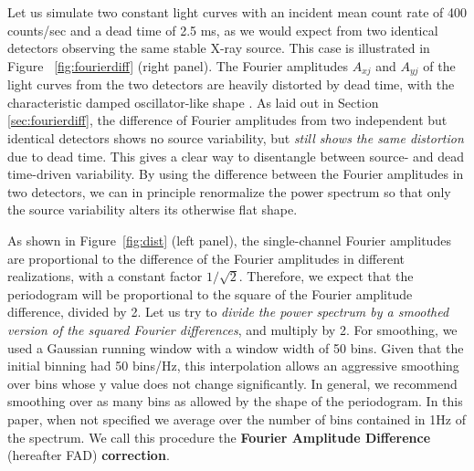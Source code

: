 \documentclass[twocolumn]{aastex61}
\begin{document}
\begin{figure*}

\caption{(a) Scatter distribution of dead time-affected Fourier amplitudes versus the difference of Fourier amplitudes:
their relation is clearly linear, with a factor $1/\sqrt{2}$. 
(b) Distribution of powers in the periodogram, before the FAD correction and after, shown as a histogram.
After correction, the powers follow remarkably well the expected $\chi^2_2$ distribution.
(c) Same, for the cospectrum.
The correct Laplace distribution is followed after FAD correction}
\label{fig:dist}
\end{figure*}

Let us simulate two constant light curves with an incident mean count rate of 400 counts/sec and a dead time of 2.5 ms, as we would expect from two identical detectors observing the same stable X-ray source. 
This case is illustrated in Figure ~\ref{fig:fourierdiff} (right panel).
The Fourier amplitudes $A_{xj}$ and $A_{yj}$ of the light curves from the two detectors are heavily distorted by dead time, with the characteristic damped oscillator-like shape \citep{Vikhlinin+94,Zhang+95}. 
As laid out in Section \ref{sec:fourierdiff}, the difference of Fourier amplitudes from two independent but identical detectors shows no source variability, but \textit{still shows the same distortion} due to dead time.
This gives a clear way to disentangle between source- and dead time-driven variability.
By using the difference between the Fourier amplitudes in two detectors, we can in principle renormalize the power spectrum so that only the source variability alters its otherwise flat shape.

As shown in Figure~\ref{fig:dist} (left panel), the single-channel Fourier amplitudes are proportional to the difference of the Fourier amplitudes in different realizations, with a constant factor $1/\sqrt{2}$.
Therefore, we expect that the periodogram will be proportional to the square of the Fourier amplitude difference, divided by 2.
Let us try to \textit{divide the power spectrum by a smoothed version of the squared Fourier differences}, and multiply by 2.
For smoothing, we used a Gaussian running window with a window width of 50 bins.
Given that the initial binning had 50 bins/Hz, this interpolation allows an aggressive smoothing over bins whose y value does not change significantly.
In general, we recommend smoothing over as many bins as allowed by the shape of the periodogram.
In this paper, when not specified we average over the number of bins contained in 1Hz of the spectrum.
We call this procedure the \textbf{Fourier Amplitude Difference} (hereafter FAD) \textbf{correction}.
\end{document}
